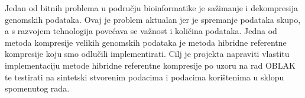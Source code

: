 Jedan od bitnih problema u području bioinformatike je sažimanje i dekompresija genomskih podataka. Ovaj je problem aktualan jer je spremanje podataka skupo, a s razvojem tehnologija povećava se važnost i količina podataka. Jedna od metoda kompresije velikih genomskih podataka je metoda hibridne referentne kompresije koju smo odlučili implementirati. Cilj je projekta napraviti vlastitu implementaciju metode hibridne referentne kompresije po uzoru na rad OBLAK te testirati na sintetski stvorenim podacima i podacima korištenima u sklopu spomenutog rada.
